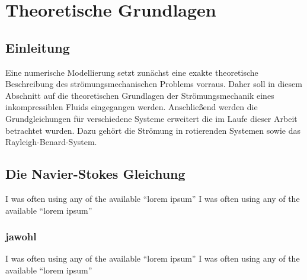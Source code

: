 \chapter{Theoretische Grundlagen}

\section{Einleitung}

Eine numerische Modellierung setzt zunächst eine exakte theoretische Beschreibung des strömungsmechanischen Problems vorraus.
Daher soll in diesem Abschnitt auf die theoretischen Grundlagen der Strömungsmechanik eines inkompressiblen Fluids eingegangen werden.
Anschließend werden die Grundgleichungen für verschiedene Systeme erweitert die im Laufe dieser Arbeit betrachtet wurden.
Dazu gehört die Strömung in rotierenden Systemen sowie das Rayleigh-Benard-System.

\section{Die Navier-Stokes Gleichung}
I was often using any of the available “lorem ipsum”
I was often using any of the available “lorem ipsum”

\subsection{jawohl}
I was often using any of the available “lorem ipsum”
I was often using any of the available “lorem ipsum”
